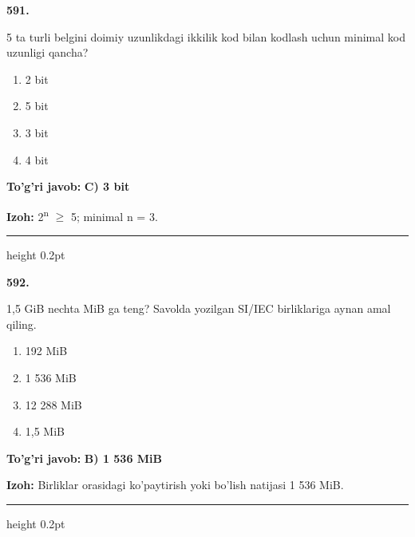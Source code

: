 \documentclass[10pt,a4paper,oneside]{article}
\begin{document}
\noindent\textbf{\color{ink}591.}
\par
5 ta turli belgini doimiy uzunlikdagi ikkilik kod bilan kodlash uchun minimal kod uzunligi qancha?
\begin{enumerate}[label=\Alph*),leftmargin=9mm]
\item 2 bit
\item 5 bit
\item 3 bit
\item 4 bit
\end{enumerate}
\begin{tcolorbox}[enhanced,breakable,colback=teal!4,colframe=teal!50!black,boxrule=0.5pt,arc=1.1mm,left=3mm,right=3mm,top=1.7mm,bottom=1.7mm,before skip=2mm,after skip=2mm]
\textbf{\color{teal}To'g'ri javob:} \textbf{C) 3 bit}
\par\smallskip
\textbf{Izoh:} 2\textsuperscript{n} \ensuremath{\geq} 5; minimal n = 3.
\end{tcolorbox}
\vspace{2mm}\hrule height 0.2pt \vspace{3mm}

\noindent\textbf{\color{ink}592.}
\par
1,5 GiB nechta MiB ga teng? Savolda yozilgan SI/IEC birliklariga aynan amal qiling.
\begin{enumerate}[label=\Alph*),leftmargin=9mm]
\item 192 MiB
\item 1 536 MiB
\item 12 288 MiB
\item 1,5 MiB
\end{enumerate}
\begin{tcolorbox}[enhanced,breakable,colback=teal!4,colframe=teal!50!black,boxrule=0.5pt,arc=1.1mm,left=3mm,right=3mm,top=1.7mm,bottom=1.7mm,before skip=2mm,after skip=2mm]
\textbf{\color{teal}To'g'ri javob:} \textbf{B) 1 536 MiB}
\par\smallskip
\textbf{Izoh:} Birliklar orasidagi ko'paytirish yoki bo'lish natijasi 1 536 MiB.
\end{tcolorbox}
\vspace{2mm}\hrule height 0.2pt \vspace{3mm}
\end{document}
